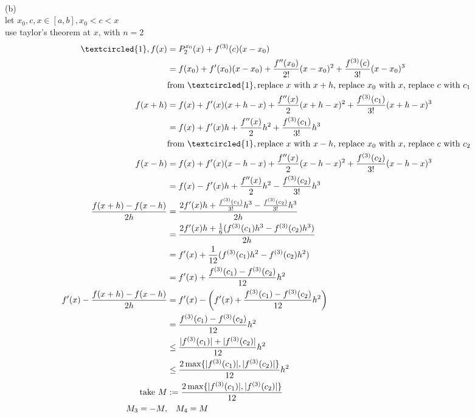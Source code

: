 \documentclass[12pt, border = 4pt, multi]{article} %
\begin{document}
\\
\\
\\
(b)\\
let $x_0, c, x \in [a, b], x_0 < c < x$\\
use taylor's theorem at $x$, with $n = 2$
\begin{align*}
\textcircled{1}, f(x) &= P_2 ^ {x_0}(x) + f ^ {(3)}(c)(x - x_0)\\
&= f(x_0) + f'(x_0)(x - x_0) + \frac{f''(x_0)}{2!}(x - x_0) ^ 2 + \frac{f ^ {(3)}(c)}{3!}(x - x_0) ^ 3\\
&\text{from }\textcircled{1}, \text{replace $x$ with $x + h$, replace $x_0$ with $x$, replace $c$ with $c_1$}\\
f(x + h) &= f(x) + f'(x)(x + h - x) + \frac{f''(x)}{2}(x + h - x) ^ 2 + \frac{f ^ {(3)}(c_1)}{3!}(x + h - x) ^ 3\\
&= f(x) + f'(x)h + \frac{f''(x)}{2}h ^ 2 + \frac{f ^ {(3)}(c_1)}{3!}h ^ 3\\
&\text{from }\textcircled{1}, \text{replace $x$ with $x - h$, replace $x_0$ with $x$, replace $c$ with $c_2$}\\
f(x - h) &= f(x) + f'(x)(x - h - x) + \frac{f''(x)}{2}(x - h - x) ^ 2 + \frac{f ^ {(3)}(c_2)}{3!}(x - h - x) ^ 3\\
&= f(x) - f'(x)h + \frac{f''(x)}{2}h ^ 2 - \frac{f ^ {(3)}(c_2)}{3!} h ^ 3\\
\frac{f(x + h) - f(x - h)}{2h} &= \frac{2f'(x)h + \frac{f ^ {(3)}(c_1)}{3!}h ^ 3 - \frac{f ^ {(3)}(c_2)}{3!} h ^ 3}{2h}\\
&= \frac{2f'(x)h + \frac{1}{6}(f ^ {(3)}(c_1)h ^ 3 - f ^ {(3)}(c_2)h ^ 3)}{2h}\\
&= f'(x) + \frac{1}{12}(f ^ {(3)}(c_1)h ^ 2 - f ^ {(3)}(c_2)h ^ 2)\\
&= f'(x) + \frac{f ^ {(3)}(c_1) - f ^ {(3)}(c_2)}{12}h ^ 2\\
f'(x) - \frac{f(x + h) - f(x - h)}{2h} &= f'(x) - \left(f'(x) + \frac{f ^ {(3)}(c_1) - f ^ {(3)}(c_2)}{12}h ^ 2\right)\\
&= \frac{f ^ {(3)}(c_1) - f ^ {(3)}(c_2)}{12}h ^ 2\\
&\leq \frac{|f ^ {(3)}(c_1)| + |f ^ {(3)}(c_2)|}{12}h ^ 2\\
&\leq \frac{2 \max\{|f ^ {(3)}(c_1)|, |f ^ {(3)}(c_2)|\}}{12}h ^ 2\\
\text{take } M &:= \frac{2 \max\{|f ^ {(3)}(c_1)|, |f ^ {(3)}(c_2)|\}}{12}\\
M_3 = -M, &\quad M_4 = M\\
\end{align*}
\end{document}
